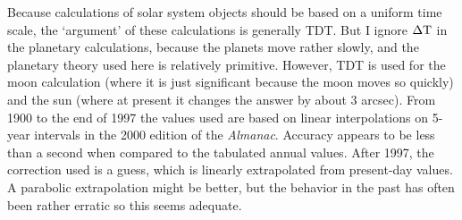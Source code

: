 Because calculations of 
solar system objects should be based on a uniform time scale, the
`argument' of these calculations is generally TDT.  But I ignore
$\rm \Delta T$ in the planetary calculations, because the
planets move rather slowly, and the planetary theory used here
is relatively primitive.  However, TDT is used for the moon calculation
(where it is just significant because the moon moves so quickly) 
and the sun (where at present it changes the answer by about 3 arcsec).
From 1900 to the end of
1997 the values used are based on linear interpolations on 5-year
intervals in the 2000 edition of the {\it Almanac}.  Accuracy appears to be
less than a second when compared to the tabulated annual values.
After 1997, the correction used is a guess, which 
is linearly extrapolated from present-day values.  A parabolic
extrapolation might be better, but the behavior in the past has
often been rather erratic so this seems adequate.

